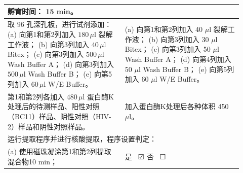 \documentclass[UTF8,10pt,a4paper,fontset=fandol]{ctexart}
\newcommand{\fieldvalue}[1]{#1}
\newcommand{\handwritten}[1]{#1}
\newcommand{\checkboxfield}[1]{\ifstrequal{#1}{checked}{☑}{\ifstrequal{#1}{unclear}{?}{☐}}}
\begin{document}
\begin{tabular}{|p{0.46\linewidth}|p{0.46\linewidth}|}
孵育时间：
\fieldvalue{\handwritten{15}} min。
\\
\hline
取 $96$ 孔深孔板，进行试剂添加：\newline
(a) 向第1和第2列加入 $180\,\mu\mathrm{l}$ 裂解工作液；\newline
(b) 向第3列加入 $40\,\mu\mathrm{l}$ Bitex；\newline
(c) 向第3列加入 $500\,\mu\mathrm{l}$ Wash Buffer A；\newline
(d) 向第3列加入 $500\,\mu\mathrm{l}$ Wash Buffer B；\newline
(e) 向第5列加入 $60\,\mu\mathrm{l}$ W/E Buffer。 &
(a) 向第1和第2列加入
\fieldvalue{\handwritten{40}} $\mu\mathrm{l}$ 裂解工作液；\newline
(b) 向第3列加入
\fieldvalue{\handwritten{30}} $\mu\mathrm{l}$ Bitex；\newline
(c) 向第3列加入
\fieldvalue{\handwritten{50}} $\mu\mathrm{l}$ Wash Buffer A；\newline
(d) 向第4列加入
\fieldvalue{\handwritten{50}} $\mu\mathrm{l}$ Wash Buffer B；\newline
(e) 向第5列加入
\fieldvalue{\handwritten{60}} $\mu\mathrm{l}$ W/E Buffer。
\\
\hline
第1和第2列各加入 $480\,\mu\mathrm{l}$ 蛋白酶K处理后的待测样品、阳性对照（BC11）样品、阴性对照（HIV-2）样品和阴性对照样品。 &
加入蛋白酶K处理后各种体积
\fieldvalue{\handwritten{450}} $\mu\mathrm{l}$。
\\
\hline
\multicolumn{2}{|l|}{运行提取程序并进行核酸提取，程序设置判定：}\\
\hline
\multicolumn{1}{|p{0.70\linewidth}|}{(a) 使用磁珠凝涂第1和第2列提取混合物10 min；} &
\multicolumn{1}{p{0.22\linewidth}|}{是\ 
\fieldvalue{\handwritten{\checkboxfield{checked}}}
\quad 否\ 
\fieldvalue{\checkboxfield{unchecked}}}\\

\end{tabular}
\end{document}
